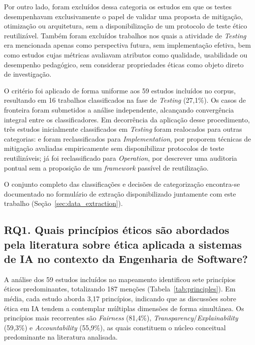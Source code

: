 Por outro lado, foram excluídos dessa categoria os estudos em que os testes desempenhavam exclusivamente o papel de validar uma proposta de mitigação, otimização ou arquitetura, sem a disponibilização de um protocolo de teste ético reutilizável. Também foram excluídos trabalhos nos quais a atividade de \textit{Testing} era mencionada apenas como perspectiva futura, sem implementação efetiva, bem como estudos cujas métricas avaliavam atributos como qualidade, usabilidade ou desempenho pedagógico, sem considerar propriedades éticas como objeto direto de investigação.

O critério foi aplicado de forma uniforme aos 59 estudos incluídos no corpus, resultando em 16 trabalhos classificados na fase de \textit{Testing} (27,1\%). Os casos de fronteira foram submetidos a análise independente, alcançando convergência integral entre os classificadores. Em decorrência da aplicação desse procedimento, três estudos inicialmente classificados em \textit{Testing} foram realocados para outras categorias: \cite{S032} e \cite{S054} foram reclassificados para \textit{Implementation}, por proporem técnicas de mitigação avaliadas empiricamente sem disponibilizar protocolos de teste reutilizáveis; já \cite{S057} foi reclassificado para \textit{Operation}, por descrever uma auditoria pontual sem a proposição de um \textit{framework} passível de reutilização.

O conjunto completo das classificações e decisões de categorização encontra-se documentado no formulário de extração disponibilizado juntamente com este trabalho (Seção~\ref{sec:data_extraction}).

\subsection{RQ1. Quais princípios éticos são abordados pela literatura sobre ética aplicada a sistemas de IA no contexto da Engenharia de Software?}

A análise dos 59 estudos incluídos no mapeamento identificou sete princípios éticos predominantes, totalizando 187 menções (Tabela~\ref{tab:principles}). Em média, cada estudo aborda 3,17 princípios, indicando que as discussões sobre ética em IA tendem a contemplar múltiplas dimensões de forma simultânea. Os princípios mais recorrentes são \textit{Fairness} (81,4\%), \textit{Transparency}/\textit{Explainability} (59,3\%) e \textit{Accountability} (55,9\%), as quais constituem o núcleo conceitual predominante na literatura analisada.

